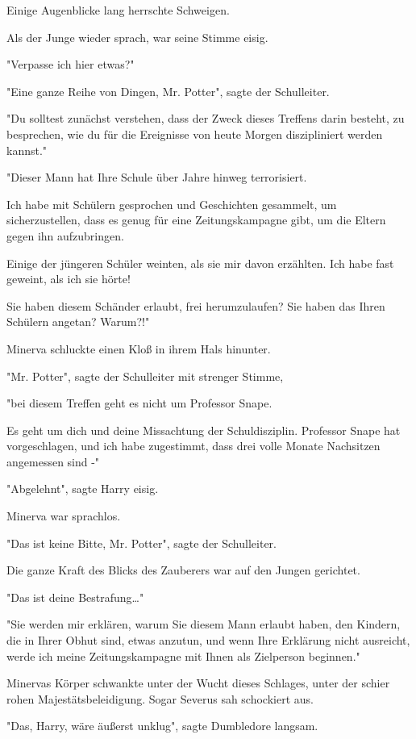 {Einige Augenblicke lang herrschte Schweigen.

Als der Junge wieder sprach, war seine Stimme eisig.

"Verpasse ich hier etwas?"

"Eine ganze Reihe von Dingen, Mr. Potter", sagte der Schulleiter.

"Du solltest zunächst verstehen, dass der Zweck dieses Treffens darin besteht, zu besprechen, wie du für die Ereignisse von heute Morgen diszipliniert werden kannst."

"Dieser Mann hat Ihre Schule über Jahre hinweg terrorisiert.

Ich habe mit Schülern gesprochen und Geschichten gesammelt, um sicherzustellen, dass es genug für eine Zeitungskampagne gibt, um die Eltern gegen ihn aufzubringen.

Einige der jüngeren Schüler weinten, als sie mir davon erzählten. Ich habe fast geweint, als ich sie hörte!

Sie haben diesem Schänder erlaubt, frei herumzulaufen? Sie haben das Ihren Schülern angetan? Warum?!"

Minerva schluckte einen Kloß in ihrem Hals hinunter.

"Mr. Potter", sagte der Schulleiter mit strenger Stimme,

"bei diesem Treffen geht es nicht um Professor Snape.

Es geht um dich und deine Missachtung der Schuldisziplin. Professor Snape hat vorgeschlagen, und ich habe zugestimmt, dass drei volle Monate Nachsitzen angemessen sind -"

"Abgelehnt", sagte Harry eisig.

Minerva war sprachlos.

"Das ist keine Bitte, Mr. Potter", sagte der Schulleiter.

Die ganze Kraft des Blicks des Zauberers war auf den Jungen gerichtet.

"Das ist deine Bestrafung…"

"Sie werden mir erklären, warum Sie diesem Mann erlaubt haben, den Kindern, die in Ihrer Obhut sind, etwas anzutun, und wenn Ihre Erklärung nicht ausreicht, werde ich meine Zeitungskampagne mit Ihnen als Zielperson beginnen."

Minervas Körper schwankte unter der Wucht dieses Schlages, unter der schier rohen Majestätsbeleidigung. Sogar Severus sah schockiert aus.

"Das, Harry, wäre äußerst unklug", sagte Dumbledore langsam.

}
